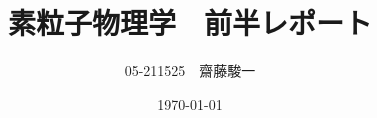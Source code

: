 \documentclass[a4paper,11pt]{jsarticle}
\begin{document}
\title{素粒子物理学　前半レポート}
\author{05-211525　齋藤駿一}
\date{\today}
\maketitle




\end{document}
